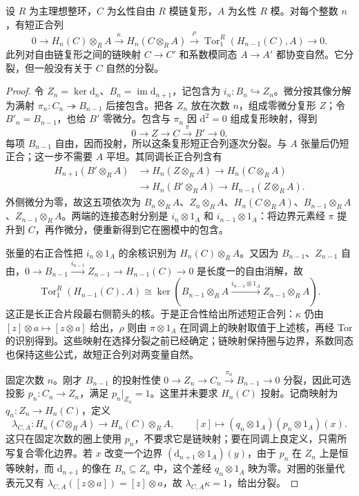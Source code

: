 \begin{theorem}[同调的万有系数定理]\label{b4:thm:uct-homology}
	设 \(R\) 为主理想整环，\(C\) 为幺性自由 \(R\) 模链复形，\(A\) 为幺性 \(R\) 模。对每个整数 \(n\)，有短正合列
	\[
		0\longrightarrow H_n(C)\otimes_R A \xrightarrow{\kappa}H_n(C\otimes_R A) \xrightarrow{\rho}\operatorname{Tor}_1^R(H_{n-1}(C),A) \longrightarrow0.
	\]
	此列对自由链复形之间的链映射 \(C\to C'\) 和系数模同态 \(A\to A'\) 都协变自然。它分裂，但一般没有关于 \(C\) 自然的分裂。
\end{theorem}
\begin{proof}
	令 \(Z_n=\ker \mathrm{d}_n\)、\(B_n=\operatorname{im}\mathrm{d}_{n+1}\)，记包含为 \(i_n:B_n\hookrightarrow Z_n\)。微分按其像分解为满射 \(\pi_n:C_n\twoheadrightarrow B_{n-1}\) 后接包含。把各 \(Z_n\) 放在次数 \(n\)，组成零微分复形 \(Z\)；令 \(B'_n=B_{n-1}\)，也给 \(B'\) 零微分。包含与 \(\pi_n\) 因 \(\mathrm{d}^2=0\) 组成复形映射，得到
	\[
		0\longrightarrow Z\longrightarrow C\xrightarrow{\pi}B' \longrightarrow0.
	\]
	每项 \(B_{n-1}\) 自由，因而投射，所以这条复形短正合列逐次分裂。与 \(A\) 张量后仍短正合；这一步不需要 \(A\) 平坦。其同调长正合列含有
	\[
		\begin{aligned}
			H_{n+1}(B'\otimes_RA)&\longrightarrow H_n(Z\otimes_RA) \longrightarrow H_n(C\otimes_RA)\\
			&\longrightarrow H_n(B'\otimes_RA) \longrightarrow H_{n-1}(Z\otimes_RA).
		\end{aligned}
	\]
	外侧微分为零，故这五项依次为 \(B_n\otimes_RA\)、\(Z_n\otimes_RA\)、\(H_n(C\otimes_RA)\)、\(B_{n-1}\otimes_RA\)、\(Z_{n-1}\otimes_RA\)。两端的连接态射分别是 \(i_n\otimes1_A\) 和 \(i_{n-1}\otimes1_A\)：将边界元素经 \(\pi\) 提升到 \(C\)，再作微分，便重新得到它在圈模中的包含。

	张量的右正合性把 \(i_n\otimes1_A\) 的余核识别为 \(H_n(C)\otimes_RA\)。又因为 \(B_{n-1}\)、\(Z_{n-1}\) 自由，\(0\to B_{n-1}\xrightarrow{i_{n-1}}Z_{n-1}\to H_{n-1}(C)\to0\) 是长度一的自由消解，故
	\[
		\operatorname{Tor}_1^R(H_{n-1}(C),A) \cong\ker\!\left(B_{n-1}\otimes_RA \xrightarrow{i_{n-1}\otimes1_A}Z_{n-1}\otimes_RA\right).
	\]
	这正是长正合片段最右侧箭头的核。于是正合性给出所述短正合列：\(\kappa\) 仍由 \([z]\otimes a\mapsto[z\otimes a]\) 给出，\(\rho\) 则由 \(\pi\otimes1_A\) 在同调上的映射取值于上述核，再经 Tor 的识别得到。这些映射在选择分裂之前已经确定；链映射保持圈与边界，系数同态也保持这些公式，故短正合列对两变量自然。

	固定次数 \(n\)。刚才 \(B_{n-1}\) 的投射性使 \(0\to Z_n\to C_n\xrightarrow{\pi_n}B_{n-1}\to0\) 分裂，因此可选投影 \(p_n:C_n\to Z_n\)，满足 \(p_n|_{Z_n}=1\)。这里并未要求 \(H_n(C)\) 投射。记商映射为 \(q_n:Z_n\to H_n(C)\)，定义
	\[
		\lambda_{C,A}:H_n(C\otimes_RA)\longrightarrow H_n(C)\otimes_RA, \qquad [x]\longmapsto(q_n\otimes1_A)(p_n\otimes1_A)(x).
	\]
	这只在固定次数的圈上使用 \(p_n\)，不要求它是链映射；要在同调上良定义，只需所写复合零化边界。若 \(x\) 改变一个边界 \((\mathrm{d}_{n+1}\otimes1_A)(y)\)，由于 \(p_n\) 在 \(Z_n\) 上是恒等映射，而 \(\mathrm{d}_{n+1}\) 的像在 \(B_n\subseteq Z_n\) 中，这个差经 \(q_n\otimes1_A\) 映为零。对圈的张量代表元又有 \(\lambda_{C,A}([z\otimes a])=[z]\otimes a\)，故 \(\lambda_{C,A}\kappa=1\)，给出分裂。


\end{proof}
